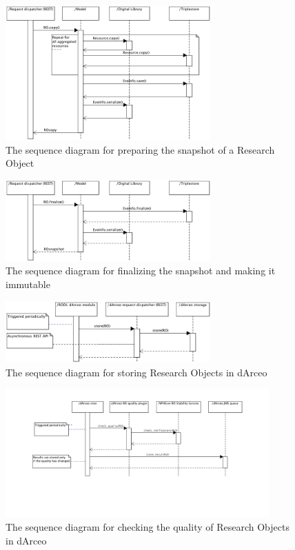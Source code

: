 \begin{figure}[!h]
\centering
\includegraphics[width=0.7\textwidth]{Figures/RODL/SnapshotPerform.png}
\caption{The sequence diagram for preparing the snapshot of a Research Object}
\label{SnapshotPerform}
\end{figure}

\begin{figure}[!h]
\centering
\includegraphics[width=0.7\textwidth]{Figures/RODL/SnapshotFinalize.png}
\caption{The sequence diagram for finalizing the snapshot and making it immutable}
\label{SnapshotFinalize}
\end{figure}

\begin{figure}[!h]
\centering
\includegraphics[width=0.7\textwidth]{Figures/RODL/dArceoStore.png}
\caption{The sequence diagram for storing Research Objects in dArceo}
\label{dArceoStore}
\end{figure}

\begin{figure}[!h]
\centering
\includegraphics[width=0.9\textwidth]{Figures/RODL/dArceoQuality.png}
\caption{The sequence diagram for checking the quality of Research Objects in dArceo}
\label{dArceoQuality}
\end{figure}

